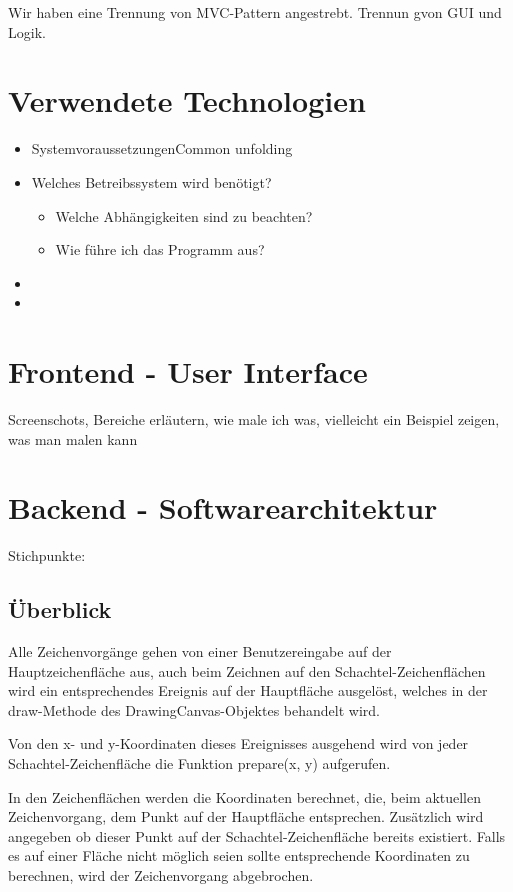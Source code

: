Wir haben eine Trennung von MVC-Pattern angestrebt. Trennun gvon GUI
und Logik.


\section{Verwendete Technologien}
\begin{itemize}
\item SystemvoraussetzungenCommon unfolding
\item Welches Betreibssystem wird benötigt?

\begin{itemize}
\item Welche Abhängigkeiten sind zu beachten?
\item Wie führe ich das Programm aus?
\end{itemize}
\item 
\item 
\end{itemize}

\section{Frontend - User Interface}

Screenschots, Bereiche erläutern, wie male ich was, vielleicht ein
Beispiel zeigen, was man malen kann


\section{Backend - Softwarearchitektur}

Stichpunkte: 



%

\subsection{Überblick}

Alle Zeichenvorgänge gehen von einer Benutzereingabe auf der Hauptzeichenfläche
aus, auch beim Zeichnen auf den Schachtel-Zeichenflächen wird ein
entsprechendes Ereignis auf der Hauptfläche ausgelöst, welches in
der draw-Methode des DrawingCanvas-Objektes behandelt wird.

Von den x- und y-Koordinaten dieses Ereignisses ausgehend wird von
jeder Schachtel-Zeichenfläche die Funktion prepare(x, y) aufgerufen.

In den Zeichenflächen werden die Koordinaten berechnet, die, beim
aktuellen Zeichenvorgang, dem Punkt auf der Hauptfläche entsprechen.
Zusätzlich wird angegeben ob dieser Punkt auf der Schachtel-Zeichenfläche
bereits existiert. Falls es auf einer Fläche nicht möglich seien sollte
entsprechende Koordinaten zu berechnen, wird der Zeichenvorgang abgebrochen.

